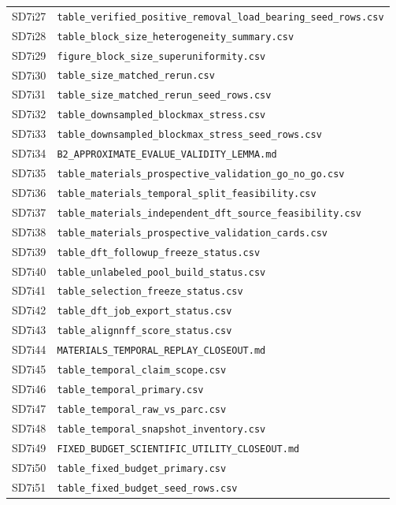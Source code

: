 \documentclass[11pt]{article}
\begin{document}
\begin{longtable}{ll}
SD7i27 & \texttt{table\_verified\_positive\_removal\_load\_bearing\_seed\_rows.csv} \\
SD7i28 & \texttt{table\_block\_size\_heterogeneity\_summary.csv} \\
SD7i29 & \texttt{figure\_block\_size\_superuniformity.csv} \\
SD7i30 & \texttt{table\_size\_matched\_rerun.csv} \\
SD7i31 & \texttt{table\_size\_matched\_rerun\_seed\_rows.csv} \\
SD7i32 & \texttt{table\_downsampled\_blockmax\_stress.csv} \\
SD7i33 & \texttt{table\_downsampled\_blockmax\_stress\_seed\_rows.csv} \\
SD7i34 & \texttt{B2\_APPROXIMATE\_EVALUE\_VALIDITY\_LEMMA.md} \\
SD7i35 & \texttt{table\_materials\_prospective\_validation\_go\_no\_go.csv} \\
SD7i36 & \texttt{table\_materials\_temporal\_split\_feasibility.csv} \\
SD7i37 & \texttt{table\_materials\_independent\_dft\_source\_feasibility.csv} \\
SD7i38 & \texttt{table\_materials\_prospective\_validation\_cards.csv} \\
SD7i39 & \texttt{table\_dft\_followup\_freeze\_status.csv} \\
SD7i40 & \texttt{table\_unlabeled\_pool\_build\_status.csv} \\
SD7i41 & \texttt{table\_selection\_freeze\_status.csv} \\
SD7i42 & \texttt{table\_dft\_job\_export\_status.csv} \\
SD7i43 & \texttt{table\_alignnff\_score\_status.csv} \\
SD7i44 & \texttt{MATERIALS\_TEMPORAL\_REPLAY\_CLOSEOUT.md} \\
SD7i45 & \texttt{table\_temporal\_claim\_scope.csv} \\
SD7i46 & \texttt{table\_temporal\_primary.csv} \\
SD7i47 & \texttt{table\_temporal\_raw\_vs\_parc.csv} \\
SD7i48 & \texttt{table\_temporal\_snapshot\_inventory.csv} \\
SD7i49 & \texttt{FIXED\_BUDGET\_SCIENTIFIC\_UTILITY\_CLOSEOUT.md} \\
SD7i50 & \texttt{table\_fixed\_budget\_primary.csv} \\
SD7i51 & \texttt{table\_fixed\_budget\_seed\_rows.csv} \\

\end{longtable}
\end{document}
